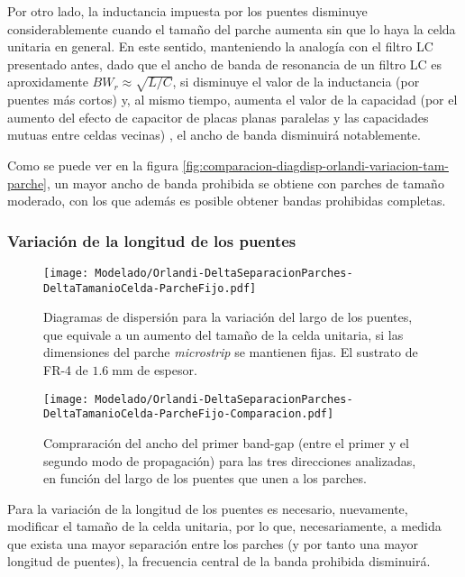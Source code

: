 Por otro lado, la inductancia impuesta por los puentes disminuye considerablemente cuando el tamaño del parche aumenta sin que lo haya la celda unitaria en general. En este sentido, manteniendo la analogía con el filtro LC presentado antes, dado que el ancho de banda de resonancia de un filtro LC es aproxidamente $BW_r \approx \sqrt{L/C}$, si disminuye el valor de la inductancia (por puentes más cortos) y, al mismo tiempo, aumenta el valor de la capacidad (por el aumento del efecto de capacitor de placas planas paralelas y las capacidades mutuas entre celdas vecinas) , el ancho de banda disminuirá notablemente.

Como se puede ver en la figura \ref{fig:comparacion-diagdisp-orlandi-variacion-tam-parche}, un mayor ancho de banda prohibida se obtiene con parches de tamaño moderado, con los que además es posible obtener bandas prohibidas completas.


\subsubsection{Variación de la longitud de los puentes}


\begin{figure}[h]
	\centering
	\texttt{[image: Modelado/Orlandi-DeltaSeparacionParches-DeltaTamanioCelda-ParcheFijo.pdf]}
	\caption{Diagramas de dispersión para la variación del largo de los puentes, que equivale a un aumento del tamaño de la celda unitaria, si las dimensiones del parche \textit{microstrip} se mantienen fijas. El sustrato de FR-4 de $1.6\;\text{mm}$ de espesor.}
	\label{fig:diagdisp-orlandi-variacion-long-puentes}
\end{figure}



\begin{figure}[h]
	\centering
	\texttt{[image: Modelado/Orlandi-DeltaSeparacionParches-DeltaTamanioCelda-ParcheFijo-Comparacion.pdf]}
	\caption{Compraración del ancho del primer band-gap (entre el primer y el segundo modo de propagación) para las tres direcciones analizadas, en función del largo de los puentes que unen a los parches.}
	\label{fig:comparacion-diagdisp-orlandi-long-puentes}
\end{figure}


Para la variación de la longitud de los puentes es necesario, nuevamente, modificar el tamaño de la celda unitaria, por lo que, necesariamente, a medida que exista una mayor separación entre los parches (y por tanto una mayor longitud de puentes), la frecuencia central de la banda prohibida disminuirá.

